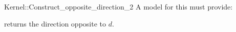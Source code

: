 \begin{ccRefFunctionObjectConcept}{Kernel::Construct_opposite_direction_2}
A model for this must provide:


 {returns the direction opposite to $d$.}

\end{ccRefFunctionObjectConcept}
